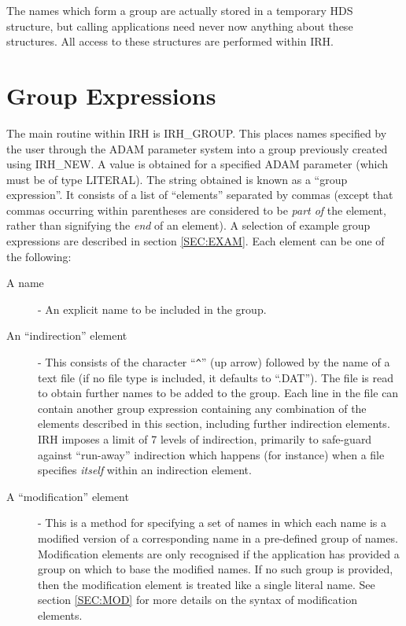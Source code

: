 The names which form a group are actually stored in a temporary HDS structure, 
but calling applications need never now anything about these structures. All 
access to these structures are performed within IRH.

\section {Group Expressions}
The main routine within IRH is IRH\_GROUP. This places names specified by the
user through the ADAM parameter system into a group previously created using
IRH\_NEW. A value is obtained for a specified ADAM parameter (which must be of
type LITERAL). The string obtained is known as a ``group expression''. It
consists of a list of ``elements'' separated by commas (except that commas
occurring within parentheses are considered to be {\em part of} the element,
rather than signifying the {\em end} of an element). A selection of example
group expressions are described in section \ref {SEC:EXAM}. Each element can be
one of the following: 
\begin{description}
\item [A name ] - An explicit name to be included in the group.
\item [An ``indirection'' element] - This consists of the character ``\verb+^+''
(up arrow) followed by the name of a text file (if no file type is included, it
defaults to ``.DAT''). The file is read to obtain further names to be added to
the group. Each line in the file can contain another group expression containing
any combination of the elements described in this section, including further
indirection elements. IRH imposes a limit of 7 levels of indirection, primarily
to safe-guard against ``run-away'' indirection which happens (for instance) when
a file specifies {\em itself} within an indirection element. 
\item [A ``modification'' element] - This is a method for specifying a set of
names in which each name is a modified version of a corresponding name in a
pre-defined group of names. Modification elements are only recognised if the
application has provided a group on which to base the modified names. If no such
group is provided, then the modification element is treated like a single
literal name. See section \ref {SEC:MOD} for more details on the syntax of
modification elements. 
\end{description}

